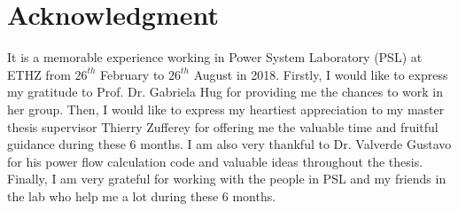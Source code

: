 \chapter*{Acknowledgment}
It is a memorable experience working in Power System Laboratory (PSL) at ETHZ from $26^{th}$ February to $26^{th}$ August in 2018. Firstly, I would like to express my gratitude to Prof. Dr. Gabriela Hug for providing me the chances to work in her group. Then, I would like to express my heartiest appreciation to my master thesis supervisor Thierry Zufferey for offering me the valuable time and fruitful guidance during these 6 months. I am also very thankful to Dr. Valverde Gustavo for his power flow calculation code and valuable ideas throughout the thesis. Finally, I am very grateful for working with the people in PSL and my friends in the lab who help me a lot during these 6 months.


\newpage